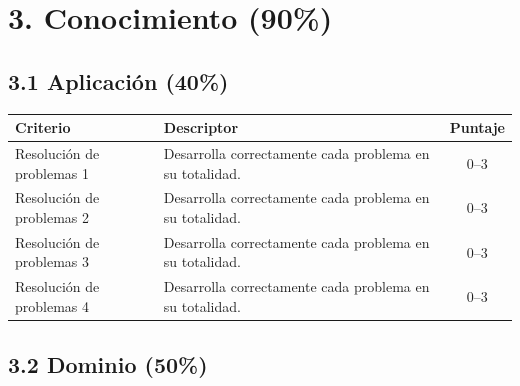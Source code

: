\documentclass[12pt]{article}
\begin{document}
	\section*{3. Conocimiento (90\%)}
	
	\subsection*{3.1 Aplicación (40\%)}
	
	\begin{center}
		\begin{tabular}{p{5cm} p{8cm} c}
			\toprule
			\textbf{Criterio} & \textbf{Descriptor} & \textbf{Puntaje} \\
			\midrule
			Resolución de problemas 1 & Desarrolla correctamente cada problema en su totalidad. & 0--3 \\
				Resolución de problemas 2 & Desarrolla correctamente cada problema en su totalidad. & 0--3 \\
					Resolución de problemas 3 & Desarrolla correctamente cada problema en su totalidad. & 0--3 \\
						Resolución de problemas 4 & Desarrolla correctamente cada problema en su totalidad. & 0--3 \\
			
			\bottomrule
		\end{tabular}
	\end{center}
	
	\vspace{0.3cm}
	
	\subsection*{3.2 Dominio (50\%)}
	
\end{document}
